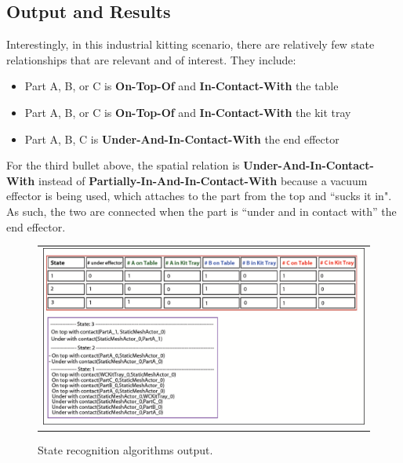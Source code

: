 \documentclass[preprint,12pt]{elsarticle}
\newcommand{\sr}[1] {\textbf{#1}}
\begin{document}
\subsection{Output and Results}
Interestingly, in this industrial kitting scenario, there are relatively few state relationships that are relevant and of interest. They include:
\begin{itemize}
 \item Part A, B, or C is \sr{On-Top-Of} and \sr{In-Contact-With} the table
 \item Part A, B, or C is \sr{On-Top-Of} and \sr{In-Contact-With} the kit tray
 \item Part A, B, C is \sr{Under-And-In-Contact-With} the end effector
\end{itemize}

For the third bullet above, the spatial relation is \sr{Under-And-In-Contact-With} instead of \sr{Partially-In-And-In-Contact-With} because a vacuum effector is being used, which attaches to the part from the top and ``sucks it in". As such, the two are connected when the part is ``under and in contact with'' the end effector.

\begin{figure}[h!t!]
\begin{center}
\begin{tabular}{c}
\includegraphics[width=13cm]{checker.eps}
\end{tabular}
\end{center}
\caption{State recognition algorithms output.}
\label{fig:staterecognition}
\end{figure}
\end{document}
